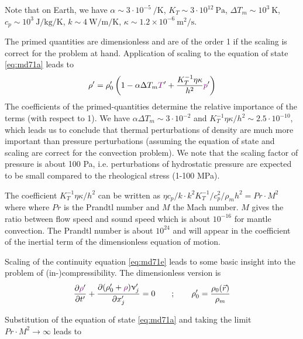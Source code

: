 Note that on Earth, we have
$\alpha \sim 3\cdot 10^{-5}~\si{\per\kelvin}$,
$K_T \sim 3\cdot 10^{12}~\si{\pascal}$,
$\Delta T_m \sim 10^3~\si{\kelvin}$,
$c_p \sim 10^3~\si{\joule\per\kg\per\kelvin}$,
$k\sim 4~\si{\watt\per\meter\per\kelvin}$,
$\kappa \sim 1.2\times 10^{-6}~\si{\square\meter\per\second}$.

The primed quantities are dimensionless and are of the order 1 if the scaling is correct for
the problem at hand.
Application of scaling to the equation of state \eqref{eq:md71a} leads to
\begin{equation}
\rho' = \rho_0' \left(  1 - \alpha \Delta T_m {\color{violet} T}' + 
\frac{K_T^{-1}\eta \kappa }{h^2} {\color{violet} p}' \right)
\label{eq:md72}
\end{equation}
The coefficients of the primed-quantities determine the relative importance of the terms
(with respect to 1). We have 
$\alpha \Delta T_m \sim 3\cdot 10^{-2}$ and $K_T^{-1}\eta \kappa/h^2 \sim 2.5\cdot 10^{-10}$,
which leads us to conclude that
thermal perturbations of density are much more important than pressure perturbations
(assuming the equation of state and scaling are correct for the convection problem). We
note that the scaling factor of pressure is about 100 Pa, i.e. perturbations of hydrostatic
pressure are expected to be small compared to the rheological stress (1-100 MPa).

The coefficient $K_T^{-1}\eta \kappa/h^2$ can be written as 
$\eta c_p/k \cdot k^2 K_T^{-1}/c_p^2/\rho_m h^2 = Pr \cdot M^2$
where where $Pr$ is the
Prandtl number and $M$ the Mach number. $M$ gives the ratio between flow speed and
sound speed which is about $10^{-16}$ for mantle convection. The Prandtl number is about $10^{24}$
and will appear in the coefficient of the inertial term of the dimensionless equation of
motion.

Scaling of the continuity equation \eqref{eq:md71e} leads to some basic insight into the problem of
(in-)compressibility. The dimensionless version is
\begin{equation}
\frac{\partial {\color{violet}\rho}'}{\partial t'} + 
\frac{\partial (\rho_0' + {\color{violet}\rho})\upnu_j'  }{\partial x_j'} = 0
\qquad
; \qquad
\rho_0' = \frac{\rho_0(\vec{r})}{\rho_m}
\label{eq:md73a}
\end{equation}


Substitution of the equation of state \eqref{eq:md71a} and taking the limit $Pr\cdot M^2 \rightarrow\infty$
leads to




















